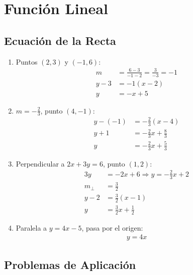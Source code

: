 \documentclass[12pt,a4paper]{article}
\begin{document}
\section{Función Lineal}

\subsection{Ecuación de la Recta}

\begin{enumerate}
    \item Puntos $(2, 3)$ y $(-1, 6)$:
    \begin{align*}
        m &= \frac{6 - 3}{-1 - 2} = \frac{3}{-3} = -1\\
        y - 3 &= -1(x - 2)\\
        y &= -x + 5
    \end{align*}
    
    \item $m = -\frac{2}{3}$, punto $(4, -1)$:
    \begin{align*}
        y - (-1) &= -\frac{2}{3}(x - 4)\\
        y + 1 &= -\frac{2}{3}x + \frac{8}{3}\\
        y &= -\frac{2}{3}x + \frac{5}{3}
    \end{align*}
    
    \item Perpendicular a $2x + 3y = 6$, punto $(1, 2)$:
    \begin{align*}
        3y &= -2x + 6 \Rightarrow y = -\frac{2}{3}x + 2\\
        m_{\perp} &= \frac{3}{2}\\
        y - 2 &= \frac{3}{2}(x - 1)\\
        y &= \frac{3}{2}x + \frac{1}{2}
    \end{align*}
    
    \item Paralela a $y = 4x - 5$, pasa por el origen:
    \begin{align*}
        y = 4x
    \end{align*}
\end{enumerate}

\subsection{Problemas de Aplicación}
\end{document}
